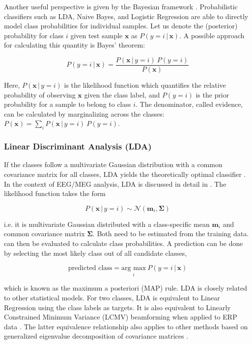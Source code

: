 \documentclass[utf8]{frontiersSCNS} %
\newcommand{\m}{\mathbf{m}}
\newcommand{\x}{\mathbf{x}}
\begin{document}
Another useful perspective is given by the Bayesian framework \citep{Bishop2007}. Probabilistic classifiers such as LDA, Naive Bayes, and Logistic Regression are able to directly model class probabilities for individual samples. Let us denote the (posterior) probability for class $i$ given  test sample $\x$ as $P(y = i\,|\,\x)$. A possible approach for calculating this quantity is Bayes' theorem:

\begin{equation}
\label{eq:bayes}
P(y = i\,|\,\x) = \frac{P(\x\,|\,y = i)\  P(y = i)}{P(\x)}
\end{equation}

Here, $P(\x\,|\,y = i)$ is the likelihood function which quantifies the relative probability of observing $\x$ given the class label, and $P(y = i)$ is the prior probability for a sample to belong to class $i$. The denominator, called evidence, can be calculated by marginalizing across the classes: $P(\x) = \sum_i P(\x\,|\,y = i)\  P(y = i)$.

\subsubsection{Linear Discriminant Analysis (LDA)}\label{sec:lda}

If the classes follow a multivariate Gaussian distribution with a common covariance matrix for all classes, LDA yields the theoretically optimal classifier \citep{Duda1998}. In the context of EEG/MEG analysis, LDA is discussed in detail in \cite{Blankertz2011}. The likelihood function takes the form

\begin{equation}
\label{eq:lda_likelihood}
P(\x\,|\,y = i) \sim \mathcal{N}(\m_i, \mathbf{\Sigma})
\end{equation}

i.e. it is multivariate Gaussian distributed with a class-specific mean $\m_i$ and common covariance matrix $\mathbf{\Sigma}$. Both need to be estimated from the training data.  can then be evaluated to calculate class probabilities. A prediction can be done by selecting the most likely class out of all candidate classes,

\begin{equation*}
\text{predicted class} = \underset{i}{\text{arg max}}\ P(y = i\,|\,\x)
\end{equation*}

which is known as the maximum a posteriori (MAP) rule. LDA is closely related to other statistical models. For two classes, LDA is equivalent to Linear Regression using the class labels as targets. It is also equivalent to Linearly Constrained Minimum Variance (LCMV) beamforming when applied to ERP data \citep{Treder2016}. The latter equivalence relationship also applies to other methods based on generalized eigenvalue decomposition of covariance matrices \citep{DeCheveigne2014JointAnalysis}.
\end{document}
